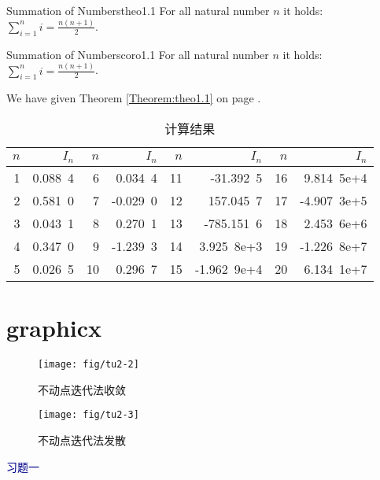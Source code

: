 \begin{theo}{Summation of Numbers}{theo1.1}
  For all natural number $n$ it holds:\\[2mm]
  $\displaystyle\sum\limits_{i=1}^n i = \frac{n(n+1)}{2}$.
\end{theo}

\begin{coro}{Summation of Numbers}{coro1.1}
  For all natural number $n$ it holds:\\[2mm]
  $\displaystyle\sum\limits_{i=1}^n i = \frac{n(n+1)}{2}$.
\end{coro}
We have given Theorem \ref{Theorem:theo1.1} on page \pageref{Theorem:theo1.1}.



\begin{table}[h]\begin{center}\color{darkblue}\caption{计算结果}\color{black}\label{tab1-1}
{\footnotesize
\begin{tabular}{r|r||r|r||r|r||r|r}\arrayrulecolor{darkblue}\hline\rowcolor{lightblue}
  $n$&$I_n$&$n$&$I_n$&$n$&$I_n$&$n$&$I_n$\\\hline
  1&0.088\ 4&6&0.034\ 4&11&-31.392\ 5&16&9.814\ 5e+4\\
  2&0.581\ 0&7&-0.029\ 0&12&157.045\ 7&17&-4.907\ 3e+5\\
  3&0.043\ 1&8&0.270\ 1&13&-785.151\ 6&18&2.453\ 6e+6\\
  4&0.347\ 0&9&-1.239\ 3&14&3.925\ 8e+3&19&-1.226\ 8e+7\\
  5&0.026\ 5&10&0.296\ 7&15&-1.962\ 9e+4&20&6.134\ 1e+7\\\hline
\end{tabular}}\end{center}\end{table}

\section{graphicx}

\begin{figure}[h]
\begin{minipage}[t]{0.5\linewidth}
\centering
\texttt{[image: fig/tu2-2]}
\caption{不动点迭代法收敛} \label{fig:tu2-2}
\end{minipage}
\begin{minipage}[t]{0.5\linewidth}
\centering
\texttt{[image: fig/tu2-3]}
\caption{不动点迭代法发散} \label{fig:tu2-3}
\end{minipage}
\end{figure}



\vspace{0.5cm}
 \centerline{\textcolor{darkblue}{\hei{}
 习题一}}\vspace{0.5cm}


